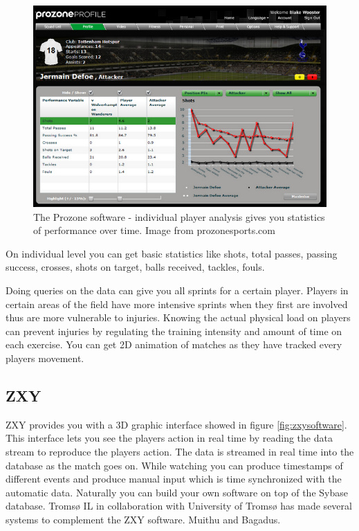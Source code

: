 \begin{figure}[ht!]
\centering
\includegraphics[width=1\textwidth]{images/general/prozonestats.png}
\caption{The Prozone software - individual player analysis gives you statistics of performance over time. Image from prozonesports.com}
\label{overflow}
\end{figure}

On individual level you can get basic statistics like shots, total passes, passing success, crosses, shots on target, balls received, tackles, fouls. 

Doing queries on the data can give you all sprints for a certain player. Players in certain areas of the field have more intensive sprints when they first are involved thus are more vulnerable to injuries. Knowing the actual physical load on players can prevent injuries by regulating the training intensity and amount of time on each exercise. You can get 2D animation of matches as they have tracked every players movement. 

\subsection{ZXY}
  
ZXY provides you with a 3D graphic interface showed in figure \ref{fig:zxysoftware}. This interface lets you see the players action in real time by reading the data stream to reproduce the players action. The data is streamed in real time into the database as the match goes on. While watching you can produce timestamps of different events and produce manual input which is time synchronized with the automatic data. Naturally you can build your own software on top of the Sybase database. Tromsø IL in collaboration with University of Tromsø has made several systems to complement the ZXY software. Muithu and Bagadus.

